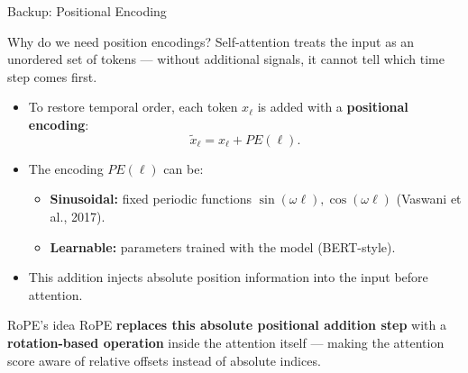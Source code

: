 \documentclass[aspectratio=169,xcolor=dvipsnames]{beamer}
\begin{document}
\begin{frame}{Backup: Positional Encoding}
\small
\begin{block}{Why do we need position encodings?}
Self-attention treats the input as an unordered set of tokens —  
without additional signals, it cannot tell which time step comes first.
\end{block}

\begin{itemize}
  \item To restore temporal order, each token $x_\ell$ is added with a \textbf{positional encoding}:
  \[
  \tilde{x}_\ell = x_\ell + PE(\ell).
  \]
  \item The encoding $PE(\ell)$ can be:
  \begin{itemize}
    \item \textbf{Sinusoidal:} fixed periodic functions $\sin(\omega \ell), \cos(\omega \ell)$ (Vaswani et al., 2017).
    \item \textbf{Learnable:} parameters trained with the model (BERT-style).
  \end{itemize}
  \item This addition injects absolute position information into the input before attention.
\end{itemize}

\begin{alertblock}{RoPE's idea}
RoPE \textbf{replaces this absolute positional addition step}  
with a \textbf{rotation-based operation} inside the attention itself —  
making the attention score aware of relative offsets instead of absolute indices.
\end{alertblock}
\end{frame}
\end{document}
